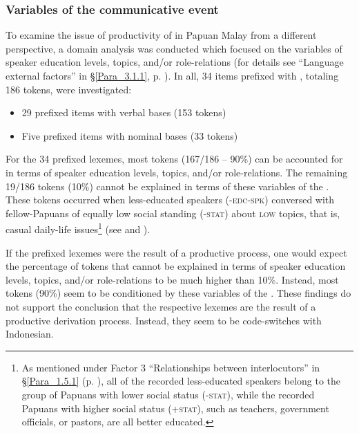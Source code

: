 \subsubsection[Variables of the {communicative event}]{Variables of the communicative event}\label{Para_3.1.4.4}

To examine the issue of productivity of  in Papuan Malay from a different perspective, a domain analysis was conducted which focused on the variables of speaker education levels, topics, and/or role-relations (for details see ``Language external factors'' in §\ref{Para_3.1.1}, p. \pageref{List_3.2}). In all, 34 items prefixed with , totaling 186 tokens, were investigated:

\begin{itemize}
\item 
29 prefixed items with verbal bases (153 tokens)
\item 
Five prefixed items with nominal bases (33 tokens)

\end{itemize}

For the 34 prefixed lexemes, most tokens (167/186 – 90\%) can be accounted for in terms of speaker education levels, topics, and/or role-relations. The remaining 19/186 tokens (10\%) cannot be explained in terms of these variables of the . These tokens occurred when less-educated speakers (\textsc{-edc-spk}) conversed with fellow-Papuans of equally low social standing (\textsc{-stat}) about \textsc{low} topics, that is, casual daily-life issues\footnote{As mentioned under Factor 3 ``Relationships between interlocutors'' in §\ref{Para_1.5.1} (p. \pageref{Item_1.3}), all of the recorded less-educated speakers belong to the group of Papuans with lower social status (\textsc{-stat}), while the recorded Papuans with higher social status (\textsc{+stat}), such as teachers, government officials, or pastors, are all better educated.} (see  and ).



If the prefixed lexemes were the result of a productive  process, one would expect the percentage of tokens that cannot be explained in terms of speaker education levels, topics, and/or role-relations to be much higher than 10\%. Instead, most tokens (90\%) seem to be conditioned by these variables of the . These findings do not support the conclusion that the respective lexemes are the result of a productive derivation process. Instead, they seem to be code-switches with Indonesian.



